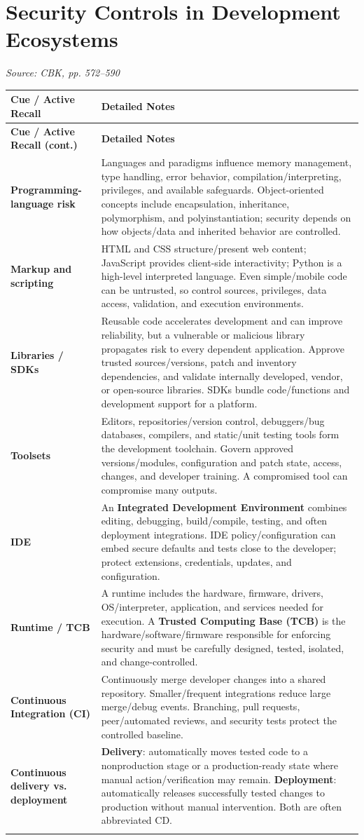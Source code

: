\documentclass[10pt,letterpaper]{article}
\makeatletter
\newenvironment{cornell}{\rowcolors{2}{white}{notebg}\begin{longtable}{@{}>{\raggedright\arraybackslash\columncolor{cuebg}\color{navy}\bfseries}p{0.285\textwidth}>{\raggedright\arraybackslash}p{0.65\textwidth}@{}}\rowcolor{navy}\color{white}\textbf{Cue / Active Recall} & \color{white}\textbf{Detailed Notes}\\ \hline\endfirsthead\rowcolor{navy}\color{white}\textbf{Cue / Active Recall (cont.)} & \color{white}\textbf{Detailed Notes}\\ \hline\endhead}{\end{longtable}}
\newcommand{\noterow}[2]{#1 & #2\\\arrayrulecolor{line}\hline}\newcommand{\source}[1]{\par{\footnotesize\color{teal}\textit{Source: CBK, #1}}\par}
\makeatother
\begin{document}
\section{\color{navy}Security Controls in Development Ecosystems}
\source{pp. 572--590}
\begin{cornell}
\noterow{Programming-language risk}{Languages and paradigms influence memory management, type handling, error behavior, compilation/interpreting, privileges, and available safeguards. Object-oriented concepts include encapsulation, inheritance, polymorphism, and polyinstantiation; security depends on how objects/data and inherited behavior are controlled.}
\noterow{Markup and scripting}{HTML and CSS structure/present web content; JavaScript provides client-side interactivity; Python is a high-level interpreted language. Even simple/mobile code can be untrusted, so control sources, privileges, data access, validation, and execution environments.}
\noterow{Libraries / SDKs}{Reusable code accelerates development and can improve reliability, but a vulnerable or malicious library propagates risk to every dependent application. Approve trusted sources/versions, patch and inventory dependencies, and validate internally developed, vendor, or open-source libraries. SDKs bundle code/functions and development support for a platform.}
\noterow{Toolsets}{Editors, repositories/version control, debuggers/bug databases, compilers, and static/unit testing tools form the development toolchain. Govern approved versions/modules, configuration and patch state, access, changes, and developer training. A compromised tool can compromise many outputs.}
\noterow{IDE}{An \textbf{Integrated Development Environment} combines editing, debugging, build/compile, testing, and often deployment integrations. IDE policy/configuration can embed secure defaults and tests close to the developer; protect extensions, credentials, updates, and configuration.}
\noterow{Runtime / TCB}{A runtime includes the hardware, firmware, drivers, OS/interpreter, application, and services needed for execution. A \textbf{Trusted Computing Base (TCB)} is the hardware/software/firmware responsible for enforcing security and must be carefully designed, tested, isolated, and change-controlled.}
\noterow{Continuous Integration (CI)}{Continuously merge developer changes into a shared repository. Smaller/frequent integrations reduce large merge/debug events. Branching, pull requests, peer/automated reviews, and security tests protect the controlled baseline.}
\noterow{Continuous delivery vs. deployment}{\textbf{Delivery}: automatically moves tested code to a nonproduction stage or a production-ready state where manual action/verification may remain. \textbf{Deployment}: automatically releases successfully tested changes to production without manual intervention. Both are often abbreviated CD.}

\end{cornell}
\end{document}
